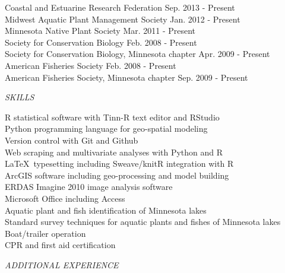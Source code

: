 \documentclass[letterpaper,12pt]{article}
\newcommand{\sectitle}[1]{\vspace{\baselineskip} \centerline{\large{\textit{#1}}}}
\begin{document}
Coastal and Estuarine Research Federation \hfill Sep. 2013 - Present \\
Midwest Aquatic Plant Management Society \hfill Jan. 2012 - Present \\
Minnesota Native Plant Society \hfill Mar. 2011 - Present \\
Society for Conservation Biology \hfill Feb. 2008 - Present \\
Society for Conservation Biology, Minnesota chapter \hfill Apr. 2009 - Present \\
American Fisheries Society \hfill Feb. 2008 - Present \\
American Fisheries Society, Minnesota chapter \hfill Sep. 2009 - Present

\sectitle{SKILLS}

R statistical software with Tinn-R text editor and RStudio \\
Python programming language for geo-spatial modeling \\
Version control with Git and Github \\
Web scraping and multivariate analyses with Python and R \\
\LaTeX\ typesetting including Sweave/knitR integration with R \\
ArcGIS software including geo-processing and model building\\
ERDAS Imagine 2010 image analysis software \\
Microsoft Office including Access \\
Aquatic plant and fish identification of Minnesota lakes \\
Standard survey techniques for aquatic plants and fishes of Minnesota lakes \\
Boat/trailer operation \\
CPR and first aid certification

\sectitle{ADDITIONAL EXPERIENCE}
\end{document}
